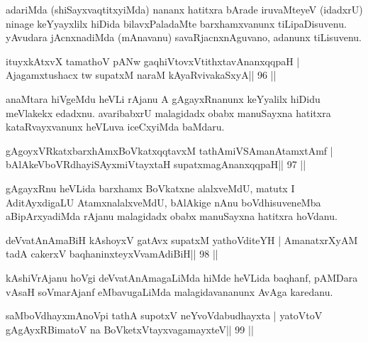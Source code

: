 \begin{artha}
adariMda (shiSayxvaqtitxyiMda) nananx hatitxra bArade iruvaMteyeV (idadxrU) ninage keYyayxlilx hiDida bilavxPaladaMte barxhamxvanunx  tiLipaDisuvenu. yAvudara jAcnxnadiMda (mAnavanu) savaRjacnxnAguvano, adanunx tiLisuvenu.
\end{artha}

\begin{shl}
ituyxkAtxvX tamathoV pANw gaqhiVtovxVtithxtavAnanxqqpaH |
Ajagamxtushacx tw supatxM naraM kAyaRvivakaSxyA\hfill || 96 ||
\end{shl}

\begin{artha}
anaMtara hiVgeMdu heVLi rAjanu A gAgayxRnanunx keYyalilx hiDidu meVlakekx edadxnu. avaribabxrU malagidadx obabx manuSayxna hatitxra kataRvayxvanunx heVLuva iceCxyiMda baMdaru.
\end{artha} 



\begin{shl}
gAgoyxVRkatxbarxhAmxBoVkatxqqtavxM tathA\s miVSAmanAtamxtAmf |
bAlAkeVboVRdhayiSAyxmiVtayxtaH supatxmagAnanxqqpaH\hfill || 97 ||
\end{shl}

\begin{artha}
gAgayxRnu heVLida barxhamx BoVkatxne alalxveMdU, matutx I AditAyxdigaLU AtamxnalalxveMdU, bAlAkige nAnu boVdhisuveneMba aBipArxyadiMda rAjanu malagidadx obabx manuSayxna hatitxra hoVdanu.
\end{artha}


\begin{shl}
deVvatAnAmaBiH kAshoyxV gatAvx supatxM yathoVditeYH |
AmanatxrXyAM tadA cakerxV baqhaninxteyxVvamAdiBiH\hfill || 98 ||
\end{shl}

\begin{artha}
kAshiVrAjanu hoVgi deVvatAnAmagaLiMda hiMde heVLida baqhanf,  pAMDara	vAsaH soVmarAjanf eMbavugaLiMda malagidavananunx AvAga karedanu.
\end{artha}

\begin{shl}
saMboVdhayxmAnoV\s pi tathA supotxV neYvoVdabudhayxta |
yatoV\s toV gAgAyxRBimatoV na BoVketxVtayxvagamayxteV\hfill || 99 ||
\end{shl}

